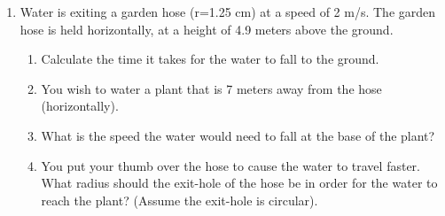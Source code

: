 \documentclass[letterpaper, 11pt]{article}
\begin{document}
\begin{enumerate}
\item Water is exiting a garden hose (r=1.25 cm) at a speed of 2 m/s.  The garden hose is held horizontally, at a height of 4.9 meters above the ground.  
	\begin{enumerate} 
		\item Calculate the time it takes for the water to fall to the ground. 
		\vspace{1in}
		\item You wish to water a plant that is 7 meters away from the hose (horizontally). 
		\vspace{1in}
	    \item What is the speed the water would need to fall at the base of the plant?
	    \vspace{1in}
		\item You put your thumb over the hose to cause the water to travel faster.  What radius should the exit-hole of the hose be in order for the water to reach the plant? (Assume the exit-hole is circular).
	\end{enumerate}





	 

\end{enumerate}

 

 
 

 
	
\end{document}
